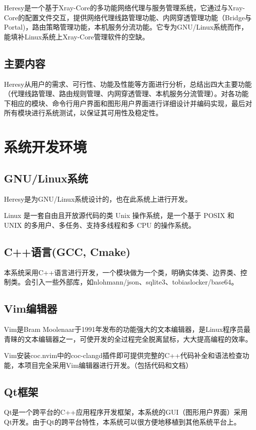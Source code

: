 \documentclass[12pt,a4paper]{article}%
\begin{document}
Heresy是一个基于Xray-Core的多功能网络代理与服务管理系统，它通过与Xray-Core的配置文件交互，提供网络代理线路管理功能、内网穿透管理功能（Bridge与Portal)，路由策略管理功能，本机服务分流功能。它专为GNU/Linux系统而作，能填补Linux系统上Xray-Core管理软件的空缺。

\subsection{主要内容}
Heresy从用户的需求、可行性、功能及性能等方面进行分析，总结出四大主要功能（代理线路管理、路由规则管理、内网穿透管理、本机服务分流管理）。对各功能下相应的模块、命令行用户界面和图形用户界面进行详细设计并编码实现，最后对所有模块进行系统测试，以保证其可用性及稳定性。

\newpage

\section{系统开发环境}
\subsection{GNU/Linux系统}
Heresy是为GNU/Linux系统设计的，也在此系统上进行开发。

Linux 是一套自由且开放源代码的类 Unix 操作系统，是一个基于 POSIX 和 UNIX 的多用户、多任务、支持多线程和多 CPU 的操作系统。

\subsection{C++语言(GCC, Cmake)}
本系统采用C++语言进行开发，一个模块做为一个类，明确实体类、边界类、控制类。会引入一些外部库，如nlohmann/json、sqlite3、tobiaslocker/base64。

\subsection{Vim编辑器}
Vim是Bram Moolenaar于1991年发布的功能强大的文本编辑器，是Linux程序员最青睐的文本编辑器之一，可使开发的全过程完全脱离鼠标，大大提高编程的效率。

Vim安装coc.nvim中的coc-clangd插件即可提供完整的C++代码补全和语法检查功能，本项目完全采用Vim编辑器进行开发。（包括代码和文档）

\subsection{Qt框架}
Qt是一个跨平台的C++应用程序开发框架，本系统的GUI（图形用户界面）采用Qt开发。由于Qt的跨平台特性，本系统可以很方便地移植到其他系统平台上。
\end{document}
